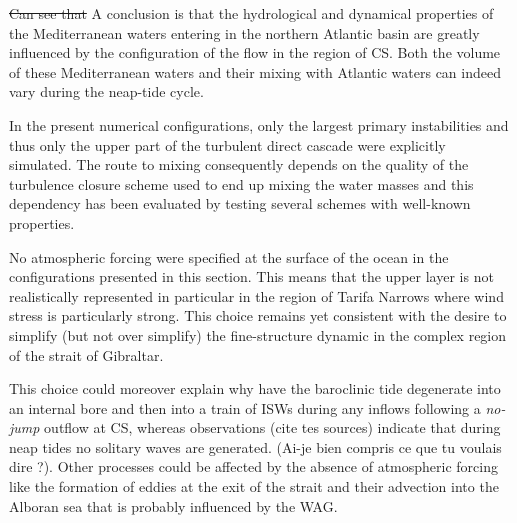 \sout{Can see that} \color{blue}A conclusion is that the hydrological and dynamical properties of the Mediterranean waters entering in the northern Atlantic basin are greatly influenced by the configuration of the flow in the region of CS. Both the volume of these Mediterranean waters and their mixing with Atlantic waters can indeed vary during the neap-tide cycle. \color{black}

\color{blue}In the present numerical configurations, only the largest primary instabilities and thus only the upper part of the turbulent direct cascade were explicitly simulated. The route to mixing consequently depends on the quality of the turbulence closure scheme used to end up mixing the water masses and this dependency has been evaluated by testing several schemes with well-known properties. 

\color{blue}No atmospheric forcing were specified at the surface of the ocean in the configurations presented in this section. This means that the upper layer is not realistically represented in particular in the region of Tarifa Narrows where wind stress is particularly strong. This choice remains yet consistent with the desire to simplify (but not over simplify) the fine-structure dynamic in the complex region of the strait of Gibraltar. \color{black}

This choice could moreover explain why have the baroclinic tide degenerate into an internal bore and then into a train of ISWs during any inflows following a \textit{no-jump} outflow at CS, whereas observations \color{green}(cite tes sources) \color{black} indicate that during neap tides no solitary waves are generated. \color{green}(Ai-je bien compris ce que tu voulais dire ?). Other processes could be affected \color{blue} by the absence of atmospheric forcing \color{black} like the formation of eddies at the exit of the strait and their advection into \color{blue}the Alboran sea \color{black} that is probably influenced by the WAG.

